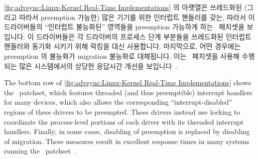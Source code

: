 \cref{fig:advsync:Linux-Kernel Real-Time Implementations}
의 아랫열은 쓰레드화된 (그리고 따라서 preemption 가능한) 많은 기기를 위한
인터럽트 핸들러를 갖는, 따라서 이 드라이버들의 ``인터럽트 불능화된'' 영역들을
preemption 가능하게 하는 \rt\ 패치셋을 보입니다.
이 드라이버들은 각 드라이버의 프로세스 단계 부분들을 쓰레드화된 인터럽트
핸들러와 동기화 시키기 위해 락킹을 대신 사용합니다.
마지막으로, 어떤 경우에는 preemption 의 불능화가 migration 불능화로 대체됩니다.
이는 \rt\ 패치셋을 사용해 수행되는 많은 시스템에서의 상당한 응답시간 개선을
보입니다~\cite{Reghenzani:2019:RLK:3309872.3297714,DanielBristot2019RTtrace}.

\iffalse

The bottom row of
\cref{fig:advsync:Linux-Kernel Real-Time Implementations}
shows the \rt\ patchset, which features threaded (and thus preemptible)
interrupt handlers for many devices, which also allows the corresponding
``interrupt-disabled'' regions of these drivers to be preempted.
These drivers instead use locking to coordinate the process-level
portions of each driver with its threaded interrupt handlers.
Finally, in some cases, disabling of preemption is replaced by
disabling of migration.
These measures result in excellent response times in many systems running
the \rt\ patchset~\cite{Reghenzani:2019:RLK:3309872.3297714,DanielBristot2019RTtrace}.

